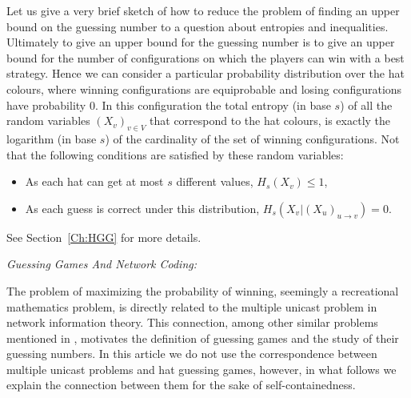\documentclass[11pt, a4paper]{kybernetika}
\begin{document}
	Let us give a very brief sketch of how to reduce the problem of finding an upper bound on the guessing number to a question about entropies and inequalities. Ultimately to give an upper bound for the guessing number is to give an upper bound for the number of configurations on which the players can win with a best strategy. Hence we can consider a particular probability distribution over the hat colours, where winning configurations are equiprobable and losing configurations have probability $0$. In this configuration the total entropy (in base $s$) of all the random variables $(X_v)_{v\in V}$ that correspond to the hat colours, is exactly the logarithm (in base $s$) of the cardinality of the set of winning configurations. Not that the following conditions are satisfied by these random variables:
	\begin{itemize}
	\item As each hat can get at most $s$ different values, $H_s(X_v)\le 1$,
	\item As each guess is correct under this distribution, $H_s(X_v|(X_u)_{u\rightarrow v})=0$.
	\end{itemize}	
	See Section~\ref{Ch:HGG} for more details.
	
	{\it Guessing Games And Network Coding:}\label{s:gg-nc}
	
	The problem of maximizing the probability of winning, seemingly a recreational mathematics problem, is directly related to the multiple unicast problem in network information theory. This connection, among other similar problems mentioned in \cite{riis2006utilising}, motivates the definition of guessing games and the study of their guessing numbers. In this article we do not use the correspondence between multiple unicast problems and hat guessing games, however, in what follows we explain the connection between them for the sake of self-containedness.
	
\end{document}
